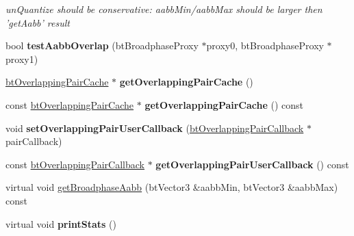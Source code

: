 \begin{DoxyCompactItemize}
\begin{DoxyCompactList}\small\item\em un\+Quantize should be conservative\+: aabb\+Min/aabb\+Max should be larger then 'get\+Aabb' result \end{DoxyCompactList}\item 
\hypertarget{classbt_axis_sweep3_internal_a24ac067f6bebde7e1905620d89c83686}{bool {\bfseries test\+Aabb\+Overlap} (bt\+Broadphase\+Proxy $\ast$proxy0, bt\+Broadphase\+Proxy $\ast$proxy1)}\label{classbt_axis_sweep3_internal_a24ac067f6bebde7e1905620d89c83686}

\item 
\hypertarget{classbt_axis_sweep3_internal_a501f2bbdc02b65b9ea0a2b42e3237841}{\hyperlink{classbt_overlapping_pair_cache}{bt\+Overlapping\+Pair\+Cache} $\ast$ {\bfseries get\+Overlapping\+Pair\+Cache} ()}\label{classbt_axis_sweep3_internal_a501f2bbdc02b65b9ea0a2b42e3237841}

\item 
\hypertarget{classbt_axis_sweep3_internal_aa2fe08f4c7624a4e33c0b70c206efbd1}{const \hyperlink{classbt_overlapping_pair_cache}{bt\+Overlapping\+Pair\+Cache} $\ast$ {\bfseries get\+Overlapping\+Pair\+Cache} () const }\label{classbt_axis_sweep3_internal_aa2fe08f4c7624a4e33c0b70c206efbd1}

\item 
\hypertarget{classbt_axis_sweep3_internal_ae8602eb252ae2085960583bd4f8e7451}{void {\bfseries set\+Overlapping\+Pair\+User\+Callback} (\hyperlink{classbt_overlapping_pair_callback}{bt\+Overlapping\+Pair\+Callback} $\ast$pair\+Callback)}\label{classbt_axis_sweep3_internal_ae8602eb252ae2085960583bd4f8e7451}

\item 
\hypertarget{classbt_axis_sweep3_internal_a2f4c74b0291bccbcf5660e17ad9745b5}{const \hyperlink{classbt_overlapping_pair_callback}{bt\+Overlapping\+Pair\+Callback} $\ast$ {\bfseries get\+Overlapping\+Pair\+User\+Callback} () const }\label{classbt_axis_sweep3_internal_a2f4c74b0291bccbcf5660e17ad9745b5}

\item 
virtual void \hyperlink{classbt_axis_sweep3_internal_a5f343e29ce818d0b96cb11260bca2a68}{get\+Broadphase\+Aabb} (bt\+Vector3 \&aabb\+Min, bt\+Vector3 \&aabb\+Max) const 
\item 
\hypertarget{classbt_axis_sweep3_internal_a5fe22bd436bcafe8f17b939cc6803a2d}{virtual void {\bfseries print\+Stats} ()}\label{classbt_axis_sweep3_internal_a5fe22bd436bcafe8f17b939cc6803a2d}

\end{DoxyCompactItemize}

